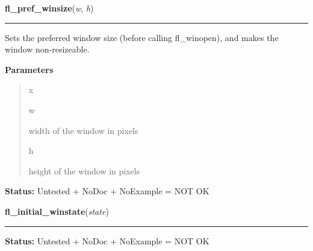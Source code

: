 \hspace{.8\funcindent}\begin{boxedminipage}{\funcwidth}

    \raggedright \textbf{fl\_pref\_winsize}(\textit{w}, \textit{h})

    \vspace{-1.5ex}

    \rule{\textwidth}{0.5\fboxrule}
\setlength{\parskip}{2ex}
    Sets the preferred window size (before calling fl\_winopen), and makes 
    the window non-resizeable.

\setlength{\parskip}{1ex}
      \textbf{Parameters}
      \vspace{-1ex}

      \begin{quote}
        \begin{Ventry}{x}

          \item[w]

          width of the window in pixels

          \item[h]

          height of the window in pixels

        \end{Ventry}

      \end{quote}

\textbf{Status:} Untested + NoDoc + NoExample = NOT OK



    \end{boxedminipage}

    \label{xformslib:library:fl_initial_winstate}

    \vspace{0.5ex}

\hspace{.8\funcindent}\begin{boxedminipage}{\funcwidth}

    \raggedright \textbf{fl\_initial\_winstate}(\textit{state})

    \vspace{-1.5ex}

    \rule{\textwidth}{0.5\fboxrule}
\setlength{\parskip}{2ex}
\setlength{\parskip}{1ex}
\textbf{Status:} Untested + NoDoc + NoExample = NOT OK



    \end{boxedminipage}

